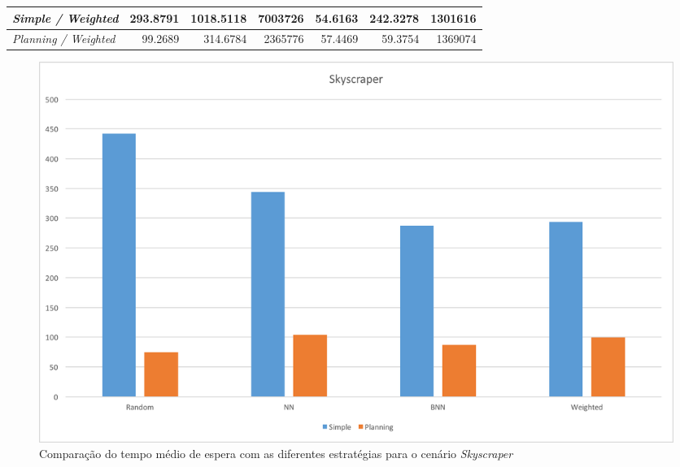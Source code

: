 \begin{table}[htb!]
\begin{tabular}{|l|r|r|r|r|r|r|}
\textit{Simple / Weighted}        & 293.8791                          & 1018.5118                           &  7003726                          & \cellcolor[HTML]{67FD9A}54.6163 & 242.3278                          & \cellcolor[HTML]{67FD9A}1301616 \\ \hline
\textit{Planning / Weighted}      &  99.2689                          &  314.6784                           &  2365776                          & 57.4469                         &  59.3754                          & 1369074                         \\ \hline
\end{tabular}
\end{table}

\begin{figure}[htb]
  \centering
  \includegraphics[scale=0.5]{img/chart-averages-skyscraper}
  \caption{Comparação do tempo médio de espera com as diferentes estratégias
    para o cenário \textit{Skyscraper}}
  \label{fig:result:average:skyscraper}
\end{figure}